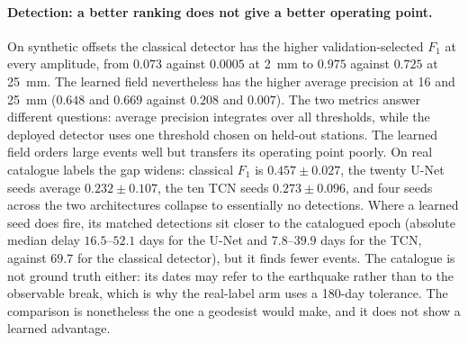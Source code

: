 \paragraph{Detection: a better ranking does not give a better operating point.}
On synthetic offsets the classical detector has the higher validation-selected
$F_1$ at every amplitude, from $0.073$ against $0.0005$ at 2~mm to $0.975$
against $0.725$ at 25~mm. The learned field nevertheless has the higher average
precision at 16 and 25~mm ($0.648$ and $0.669$ against $0.208$ and $0.007$). The
two metrics answer different questions: average precision integrates over all
thresholds, while the deployed detector uses one threshold chosen on held-out
stations. The learned field orders large events well but transfers its operating
point poorly. On real catalogue labels the gap widens: classical $F_1$ is
$0.457 \pm 0.027$, the twenty U-Net seeds average $0.232 \pm 0.107$, the ten TCN
seeds $0.273 \pm 0.096$, and four seeds across the two architectures collapse to
essentially no detections. Where a learned seed does fire, its matched detections
sit closer to the catalogued epoch (absolute median delay $16.5$--$52.1$ days for
the U-Net and $7.8$--$39.9$ days for the TCN, against $69.7$ for the classical
detector), but it finds fewer events. The catalogue is not ground truth either: its dates may refer to
the earthquake rather than to the observable break, which is why the real-label
arm uses a 180-day tolerance. The comparison is nonetheless the one a geodesist
would make, and it does not show a learned advantage.

